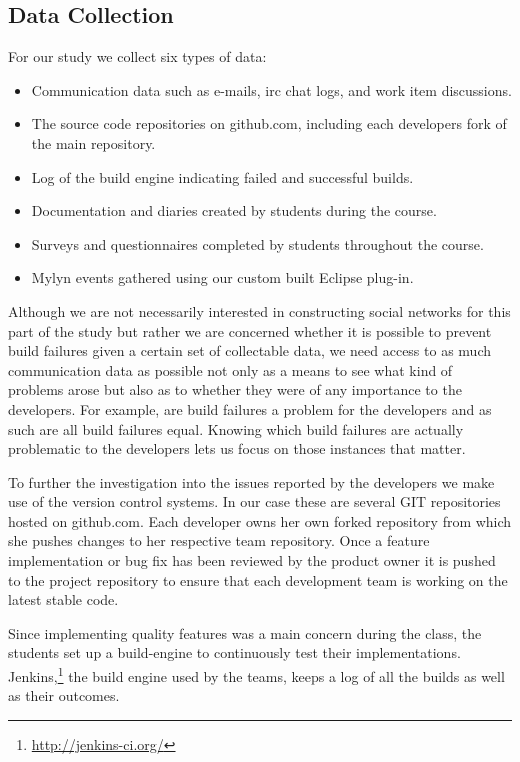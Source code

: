 \subsection{Data Collection}
For our study we collect six types of data:
\begin{itemize}
\item Communication data such as e-mails, irc chat logs, and work item discussions.
\item The source code repositories on github.com, including each developers fork of the main repository.
\item Log of the build engine indicating failed and successful builds.
\item Documentation and diaries created by students during the course.
\item Surveys and questionnaires completed by students throughout the course. 
\item Mylyn events gathered using our custom built Eclipse plug-in.
\end{itemize}

Although we are not necessarily interested in constructing social networks for this part of the study but rather we are concerned whether it is possible to prevent build failures given a certain set of collectable data, we need access to as much communication data as possible not only as a means to see what kind of problems arose but also as to whether they were of any importance to the developers.
%
For example, are build failures a problem for the developers and as such are all build failures equal.
Knowing which build failures are actually problematic to the developers lets us focus on those instances that matter.

To further the investigation into the issues reported by the developers we make use of the version control systems.
In our case these are several GIT repositories hosted on github.com.
Each developer owns her own forked repository from which she pushes changes to her respective team repository.
Once a feature implementation or bug fix has been reviewed by the product owner it is pushed to the project repository to ensure that each development team is working on the latest stable code.

Since implementing quality features was a main concern during the class, the students set up a build-engine to continuously test their implementations.
Jenkins,\footnote{\url{http://jenkins-ci.org/}} the build engine used by the teams, keeps a log of all the builds as well as their outcomes.


